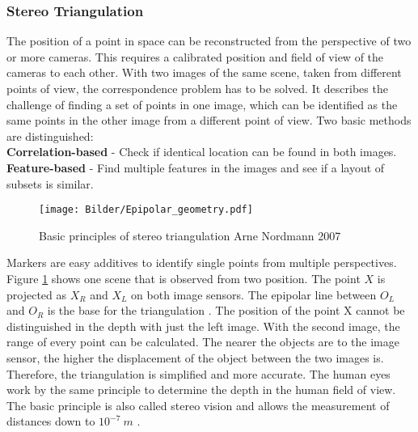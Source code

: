 \subsubsection{Stereo Triangulation}
The position of a point in space can be reconstructed from the perspective of two or more cameras. This requires a calibrated position and field of view of the cameras to each other. With two images of the same scene, taken from different points of view, the correspondence problem has to be solved. It describes the challenge of finding a set of points in one image, which can be identified as the same points in the other image from a different point of view. Two basic methods are distinguished:\\

\textbf{Correlation-based} - Check if identical location can be found in both images.\\
\medskip
\textbf{Feature-based} - Find multiple features in the images and see if a layout of subsets is similar.\\

\begin{figure} [!h]
	\centering
	\texttt{[image: Bilder/Epipolar\_geometry.pdf]}
	\caption{Basic principles of stereo triangulation \tiny Arne Nordmann 2007 \ccbysa }
	\label{fig:stereovision}
\end{figure} 

Markers are easy additives to identify single points from multiple perspectives. Figure \ref{fig:stereovision} shows one scene that is observed from two position. The point $X$ is projected as $X_R$ and $X_L$ on both image sensors. The epipolar line between $O_L$ and $O_R$ is the base for the triangulation \cite{finsterwalder1897geometrischen}. The position of the point X cannot be distinguished in the depth with just the left image. With the second image, the range of every point can be calculated. The nearer the objects are to the image sensor, the higher  the displacement of the object between the two images is. Therefore, the triangulation is simplified and more accurate. The human eyes work by the same principle to determine the depth in the human field of view. The basic principle is also called stereo vision and allows the measurement of distances down to $10^{-7}~m$ \cite{thierryoggietof}.



